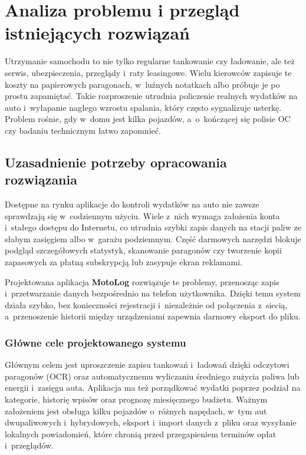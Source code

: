 ﻿\chapter{Analiza problemu i przegląd istniejących rozwiązań}
\label{cha:analiza_problemu}

Utrzymanie samochodu to nie tylko regularne tankowanie czy ładowanie, ale też serwis, ubezpieczenia, przeglądy i~raty leasingowe. Wielu kierowców zapisuje te koszty na papierowych paragonach, w~luźnych notatkach albo próbuje je po prostu zapamiętać. Takie rozproszenie utrudnia policzenie realnych wydatków na auto i~wyłapanie nagłego wzrostu spalania, który często sygnalizuje usterkę. Problem rośnie, gdy w~domu jest kilka pojazdów, a~o~kończącej się polisie OC czy badaniu technicznym łatwo zapomnieć.

\section{Uzasadnienie potrzeby opracowania rozwiązania}
\label{sec:uzasadnienie_rozwiazania}

Dostępne na rynku aplikacje do kontroli wydatków na auto nie zawsze sprawdzają się w~codziennym użyciu. Wiele z~nich wymaga założenia konta i~stałego dostępu do Internetu, co utrudnia szybki zapis danych na stacji paliw ze słabym zasięgiem albo w~garażu podziemnym. Część darmowych narzędzi blokuje podgląd szczegółowych statystyk, skanowanie paragonów czy tworzenie kopii zapasowych za płatną subskrypcją lub zasypuje ekran reklamami.

Projektowana aplikacja \textbf{MotoLog} rozwiązuje te problemy, przenosząc zapis i~przetwarzanie danych bezpośrednio na telefon użytkownika. Dzięki temu system działa szybko, bez konieczności rejestracji i~niezależnie od połączenia z~siecią, a~przenoszenie historii między urządzeniami zapewnia darmowy eksport do pliku.

\subsection{Główne cele projektowanego systemu}
\label{subsec:glowne_cele}

Głównym celem jest uproszczenie zapisu tankowań i~ładowań dzięki odczytowi paragonów (OCR) oraz automatycznemu wyliczaniu średniego zużycia paliwa lub energii i~zasięgu auta. Aplikacja ma też porządkować wydatki poprzez podział na kategorie, historię wpisów oraz prognozę miesięcznego budżetu. Ważnym założeniem jest obsługa kilku pojazdów o~różnych napędach, w~tym aut dwupaliwowych i~hybrydowych, eksport i~import danych z~pliku oraz wysyłanie lokalnych powiadomień, które chronią przed przegapieniem terminów opłat i~przeglądów.

